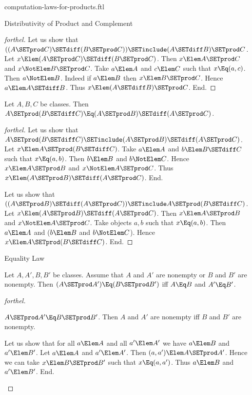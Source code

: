 \documentclass{stex}
\begin{document}
\begin{smodule}{computation-laws-for-products.ftl}
\begin{sfragment}{Distributivity of Product and Complement}
\begin{proof}[forthel]
    Let us show that $((A \SETprod C) \SETdiff (B \SETprod C)) \SETinclude (A \SETdiff B) \SETprod C$. %
      Let $x \Elem (A \SETprod C) \SETdiff (B \SETprod C)$.
      Then $x \Elem A \SETprod C$ and $x \NotElem B \SETprod C$.
      Take $a \Elem A$ and $c \Elem C$ such that $x \Eq (a, c)$.
      Then $a \NotElem B$.
      Indeed if $a \Elem B$ then $x \Elem B \SETprod C$.
      Hence $a \Elem A \SETdiff B$.
      Thus $x \Elem (A \SETdiff B) \SETprod C$.
    End.
  \end{proof}

  \begin{proposition}[forthel]
    Let $A, B, C$ be classes.
    Then $A \SETprod (B \SETdiff C) \Eq (A \SETprod B) \SETdiff (A \SETprod C)$.
  \end{proposition}
  \begin{proof}[forthel]
    Let us show that $A \SETprod (B \SETdiff C) \SETinclude (A \SETprod B) \SETdiff (A \SETprod C)$.
      Let $x \Elem A \SETprod (B \SETdiff C)$.
      Take $a \Elem A$ and $b \Elem B \SETdiff C$ such that $x \Eq (a, b)$.
      Then $b \Elem B$ and $b \NotElem C$.
      Hence $x \Elem A \SETprod B$ and $x \NotElem A \SETprod C$.
      Thus $x \Elem (A \SETprod B) \SETdiff (A \SETprod C)$.
    End.

    Let us show that $((A \SETprod B) \SETdiff (A \SETprod C)) \SETinclude A \SETprod (B \SETdiff C)$. %
      Let $x \Elem (A \SETprod B) \SETdiff (A \SETprod C)$.
      Then $x \Elem A \SETprod B$ and $x \NotElem A \SETprod C$.
      Take objects $a, b$ such that $x \Eq (a, b)$.
      Then $a \Elem A$ and ($b \Elem B$ and $b \NotElem C$).
      Hence $x \Elem A \SETprod (B \SETdiff C)$.
    End.
  \end{proof}
\end{sfragment}

\begin{sfragment}{Equality Law}
  \begin{proposition}[forthel]
    Let $A, A', B, B'$ be classes.
    Assume that $A$ and $A'$ are nonempty or $B$ and $B'$ are nonempty.
    Then $(A \SETprod A') \Eq (B \SETprod B')$ iff $A \Eq B$ and $A' \Eq B'$.
  \end{proposition}
  \begin{proof}[forthel]
    \begin{case}{$A \SETprod A' \Eq B \SETprod B'$.}
      Then $A$ and $A'$ are nonempty iff $B$ and $B'$ are nonempty.

      Let us show that for all $a \Elem A$ and all $a' \Elem A'$ we have $a \Elem B$ and $a' \Elem B'$.
        Let $a \Elem A$ and $a' \Elem A'$.
        Then $(a, a') \Elem A \SETprod A'$.
        Hence we can take $x \Elem B \SETprod B'$ such that $x \Eq (a, a')$.
        Thus $a \Elem B$ and $a' \Elem B'$.
      End.


\end{case}
\end{proof}
\end{sfragment}
\end{smodule}
\end{document}
